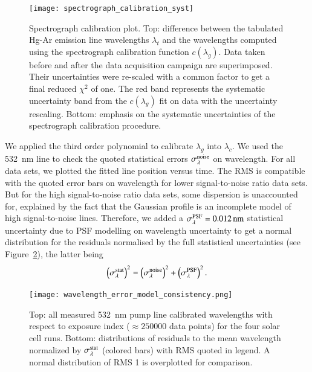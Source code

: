 \begin{figure}[!h]
\centering
\texttt{[image: spectrograph\_calibration\_syst]}
\caption{Spectrograph calibration plot. Top: difference between the tabulated Hg-Ar emission line wavelengths $\lambda_t$ and the wavelengths computed using the spectrograph calibration function $c(\lambda_g)$. Data taken before and after the data acquisition campaign are superimposed. Their uncertainties were re-scaled with a common factor to get a final reduced $\chi^2$ of one. The red band represents the systematic uncertainty band from the $c(\lambda_g)$ fit on data with the uncertainty rescaling. Bottom: emphasis on the systematic uncertainties of the spectrograph calibration procedure.}\label{fig:spectro_calib_syst}
\end{figure}

We applied the third order polynomial to calibrate $\lambda_g$ into $\lambda_c$. We used the \SI{532}{\nm} line to check the quoted statistical errors $\sigma_\lambda^{\rm noise}$ on wavelength. For all data sets, we plotted the fitted line position versus time. The RMS is compatible with the quoted error bars on wavelength for lower signal-to-noise ratio data sets. But for the high signal-to-noise ratio data sets, some dispersion is unaccounted for, explained by the fact that the Gaussian profile is an incomplete model of high signal-to-noise lines. Therefore, we added a $\sigma_\lambda^{\rm PSF}=\SI{0.012}{\nm}$ statistical uncertainty due to PSF modelling on wavelength uncertainty to get a normal distribution for the residuals normalised by the full statistical uncertainties (see Figure~\ref{fig:wavelength_error_model_consistency}), the latter being
\begin{equation}
    \left(\sigma_{\lambda}^{\rm stat}\right)^2 =  \left(\sigma_{\lambda}^{\rm noise}\right)^2 +  \left(\sigma_{\lambda}^{\rm PSF}\right)^2.
\end{equation}

\begin{figure}[!h]
\centering
\texttt{[image: wavelength\_error\_model\_consistency.png]}
\caption{Top: all measured \SI{532}{\nm} pump line calibrated wavelengths with respect to exposure index ($\approx\num{250000}$ data points) for the four solar cell runs. Bottom: distributions of residuals to the mean wavelength normalized by $\sigma_{\lambda}^{\rm stat}$ (colored bars) with RMS quoted in legend. A normal distribution of RMS 1 is overplotted for comparison.}\label{fig:wavelength_error_model_consistency}
\end{figure}

